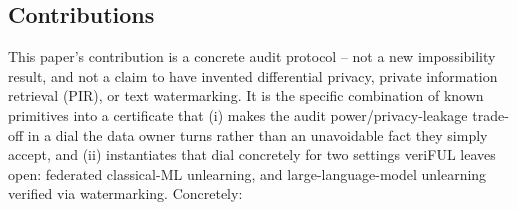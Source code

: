 \documentclass[10pt,journal,compsoc]{IEEEtran}
\begin{document}
\subsection{Contributions}

This paper's contribution is a concrete audit protocol -- not a new impossibility result, and not a claim to have invented differential privacy, private information retrieval (PIR), or text watermarking. It is the specific combination of known primitives into a certificate that (i) makes the audit power/privacy-leakage trade-off in \cite{tang2026geometric} a dial the data owner turns rather than an unavoidable fact they simply accept, and (ii) instantiates that dial concretely for two settings veriFUL leaves open: federated classical-ML unlearning, and large-language-model unlearning verified via watermarking. Concretely:
\end{document}

